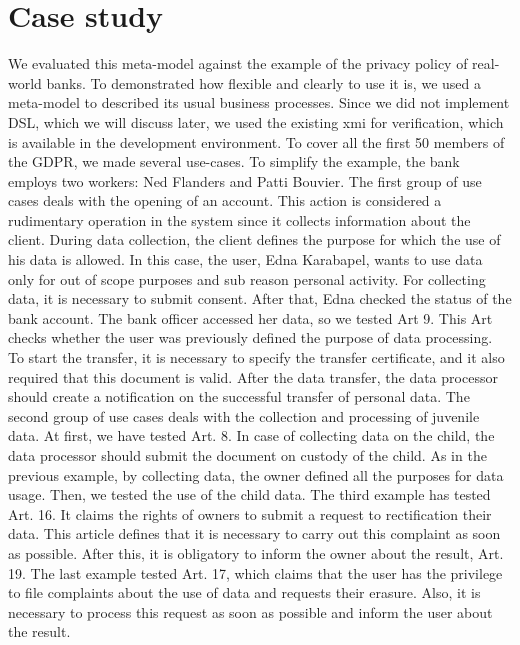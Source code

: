\documentclass[11pt,english]{article}
\begin{document}
\section{Case study}
We evaluated this meta-model against the example of the privacy policy of real-world banks. To demonstrated how flexible and clearly to use it is, we used a meta-model to described its usual business processes. Since we did not implement DSL, which we will discuss later, we used the existing xmi for verification, which is available in the development environment. To cover all the first 50 members of the GDPR, we made several use-cases. To simplify the example, the bank employs two workers: Ned Flanders and Patti Bouvier. \newline The first group of use cases deals with the opening of an account. This action is considered a rudimentary operation in the system since it collects information about the client. During data collection, the client defines the purpose for which the use of his data is allowed. In this case, the user, Edna Karabapel, wants to use data only for out of scope purposes and sub reason personal activity. For collecting data, it is necessary to submit consent. After that, Edna checked the status of the bank account. The bank officer accessed her data, so we tested Art 9. This Art checks whether the user was previously defined the purpose of data processing. To start the transfer, it is necessary to specify the transfer certificate, and it also required that this document is valid. After the data transfer, the data processor should create a notification on the successful transfer of personal data. \newline The second group of use cases deals with the collection and processing of juvenile data. At first, we have tested Art. 8. In case of collecting data on the child, the data processor should submit the document on custody of the child. As in the previous example, by collecting data, the owner defined all the purposes for data usage. Then, we tested the use of the child data. The third example has tested Art. 16. It claims the rights of owners to submit a request to rectification their data. This article defines that it is necessary to carry out this complaint as soon as possible. After this, it is obligatory to inform the owner about the result, Art. 19. The last example tested Art. 17, which claims that the user has the privilege to file complaints about the use of data and requests their erasure. Also, it is necessary to process this request as soon as possible and inform the user about the result. 
\end{document}
